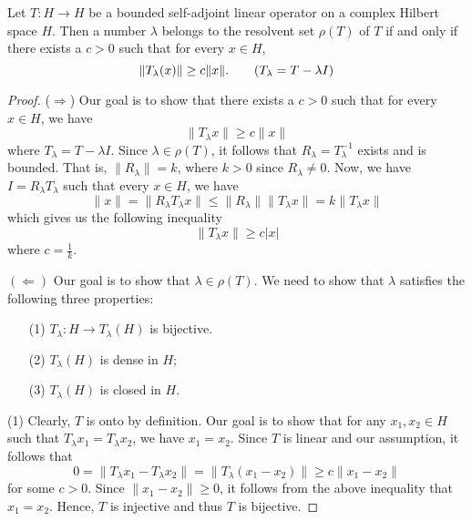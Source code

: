\begin{theorem}\label{9.1-2}
    Let \( T: H \to H  \) be a bounded self-adjoint linear operator on a complex Hilbert space \( H \). Then a number \( \lambda  \) belongs to the resolvent set \( \rho(T)  \) of \( T  \) if and only if there exists a \( c > 0  \) such that for every \( x \in H \),
    \[  \|{T}_{\lambda}(x)\| \geq c \|x\|. \tag{\( {T}_{\lambda} = T - \lambda I  \)} \]

\end{theorem}
\begin{proof}
    (\( \Longrightarrow \)) Our goal is to show that there exists a \( c > 0  \) such that for every \( x \in H \), we have  
    \[  \|{T}_{\lambda}x \| \geq c \|x \| \tag{2} \]
    where \( {T}_{\lambda} = T - \lambda I  \). 
    Since \( \lambda \in \rho(T) \), it follows that \( {R}_{\lambda} = T^{-1}_{\lambda} \) exists and is bounded. That is, \( \|{R}_{\lambda}\| = k  \), where \( k > 0  \) since \( {R}_{\lambda} \neq 0  \). Now, we have \( I = {R}_{\lambda} {T}_{\lambda} \) such that every \( x \in H \), we have 
    \[  \|x \| = \|{R}_{\lambda} {T}_{\lambda}x \| \leq  \|{R}_{\lambda} \| \|{T}_{\lambda} x \| = k \|{T}_{\lambda}x \|  \]
    which gives us the following inequality
    \[  \|{T}_{\lambda}x \| \geq c | x  |  \]
    where \( c = \frac{ 1 }{ k  }  \).

    \( (\Longleftarrow) \) Our goal is to show that \( \lambda \in \rho(T) \). We need to show that \( \lambda  \) satisfies the following three properties:
    \begin{enumerate}
        \item[(1)] \( {T}_{\lambda} : H \to {T}_{\lambda}(H) \) is bijective.
        \item[(2)] \( {T}_{\lambda}(H) \) is dense in \( H  \);
        \item[(3)] \( {T}_{\lambda}(H) \) is closed in \( H \).
    \end{enumerate}
    (1) Clearly, \( T  \) is onto by definition. Our goal is to show that for any \( {x}_{1}, {x}_{2} \in H  \) such that \( {T}_{\lambda} {x}_{1} = {T}_{\lambda} {x}_{2} \), we have \( {x}_{1} = {x}_{2} \). Since \( T  \) is linear and our assumption, it follows that 
    \[  0 = \|{T}_{\lambda}{x}_{1} - {T}_{\lambda} {x}_{2} \| = \|{T}_{\lambda} ({x}_{1} - {x}_{2})\| \geq c \| {x}_{1} - {x}_{2} \| \]
    for some \( c > 0  \). Since \( \|{x}_{1} - {x}_{2}\| \geq 0  \), it follows from the above inequality that \( {x}_{1} = {x}_{2} \). Hence, \( T  \) is injective and thus \( T  \) is bijective.


\end{proof}
